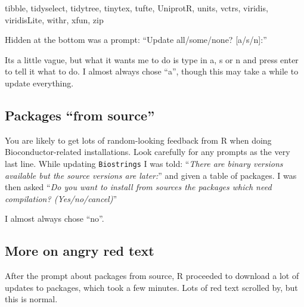 \documentclass[
]{book}
\newenvironment{Shaded}{\begin{snugshade}}{\end{snugshade}}
\newcommand{\NormalTok}[1]{#1}
\newcommand{\StringTok}[1]{\textcolor[rgb]{0.31,0.60,0.02}{#1}}
\begin{document}
\begin{Shaded}
\begin{Highlighting}[]
  \StringTok{\textquotesingle{}tibble\textquotesingle{}}\NormalTok{, }\StringTok{\textquotesingle{}tidyselect\textquotesingle{}}\NormalTok{, }\StringTok{\textquotesingle{}tidytree\textquotesingle{}}\NormalTok{, }\StringTok{\textquotesingle{}tinytex\textquotesingle{}}\NormalTok{, }\StringTok{\textquotesingle{}tufte\textquotesingle{}}\NormalTok{, }\StringTok{\textquotesingle{}UniprotR\textquotesingle{}}\NormalTok{, }\StringTok{\textquotesingle{}units\textquotesingle{}}\NormalTok{, }\StringTok{\textquotesingle{}vctrs\textquotesingle{}}\NormalTok{,}
  \StringTok{\textquotesingle{}viridis\textquotesingle{}}\NormalTok{, }\StringTok{\textquotesingle{}viridisLite\textquotesingle{}}\NormalTok{, }\StringTok{\textquotesingle{}withr\textquotesingle{}}\NormalTok{, }\StringTok{\textquotesingle{}xfun\textquotesingle{}}\NormalTok{, }\StringTok{\textquotesingle{}zip\textquotesingle{}}
\end{Highlighting}
\end{Shaded}

Hidden at the bottom was a prompt: ``Update all/some/none? {[}a/s/n{]}:''

Its a little vague, but what it wants me to do is type in a, s or n and press enter to tell it what to do. I almost always chose ``a'', though this may take a while to update everything.

\hypertarget{packages-from-source}{%
\subsection{Packages ``from source''}\label{packages-from-source}}

You are likely to get lots of random-looking feedback from R when doing Bioconductor-related installations. Look carefully for any prompts as the very last line. While updating \texttt{Biostrings} I was told: ``\emph{There are binary versions available but the source versions are later:}'' and given a table of packages. I was then asked ``\emph{Do you want to install from sources the packages which need compilation? (Yes/no/cancel)}''

I almost always chose ``no''.

\hypertarget{more-on-angry-red-text}{%
\subsection{More on angry red text}\label{more-on-angry-red-text}}

After the prompt about packages from source, R proceeded to download a lot of updates to packages, which took a few minutes. Lots of red text scrolled by, but this is normal.
\end{document}
